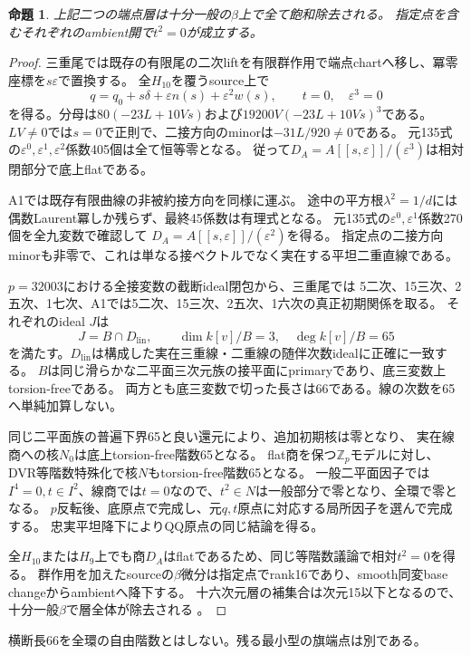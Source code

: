 \documentclass[11pt,a4paper]{ltjsarticle}
\newtheorem{proposition}[theorem]{命題}
\theoremstyle{remark}
\begin{document}
\begin{proposition}
上記二つの端点層は十分一般の$\beta$上で全て飽和除去される。
指定点を含むそれぞれのambient開で$t^2=0$が成立する。
\end{proposition}
\begin{proof}
三重尾では既存の有限尾の二次liftを有限群作用で端点chartへ移し、冪零座標を$s\varepsilon$で置換する。
全$H_{10}$を覆うsource上で
\[
 q=q_0+s\delta+\varepsilon n(s)+\varepsilon^2w(s),\qquad
 t=0,\quad\varepsilon^3=0
\]
を得る。分母は$80(-23L+10Vs)$および$19200V(-23L+10Vs)^3$である。
$LV\ne0$では$s=0$で正則で、二接方向のminorは$-31L/920\ne0$である。
元135式の$\varepsilon^0,\varepsilon^1,\varepsilon^2$係数405個は全て恒等零となる。
従って$D_A=A[[s,\varepsilon]]/(\varepsilon^3)$は相対閉部分で底上flatである。

A1では既存有限曲線の非被約接方向を同様に運ぶ。
途中の平方根$\lambda^2=1/d$には偶数Laurent冪しか残らず、最終45係数は有理式となる。
元135式の$\varepsilon^0,\varepsilon^1$係数270個を全九変数で確認して
$D_A=A[[s,\varepsilon]]/(\varepsilon^2)$を得る。
指定点の二接方向minorも非零で、これは単なる接ベクトルでなく実在する平坦二重直線である。

$p=32003$における全接変数の截断ideal閉包から、三重尾では
5二次、15三次、2五次、1七次、A1では5二次、15三次、2五次、1六次の真正初期関係を取る。
それぞれのideal $J$は
\[
 J=B\cap D_{\mathrm{lin}},\qquad
 \dim k[v]/B=3,\quad\deg k[v]/B=65
\]
を満たす。$D_{\mathrm{lin}}$は構成した実在三重線・二重線の随伴次数idealに正確に一致する。
$B$は同じ滑らかな二平面三次元族の接平面にprimaryであり、底三変数上torsion-freeである。
両方とも底三変数で切った長さは66である。線の次数を65へ単純加算しない。

同じ二平面族の普遍下界65と良い還元により、追加初期核は零となり、
実在線商への核$N_0$は底上torsion-free階数65となる。
flat商を保つ$\mathbb Z_p$モデルに対し、DVR等階数特殊化で核$N$もtorsion-free階数65となる。
一般二平面因子では$ I^4=0,t\in I^2$、線商では$t=0$なので、$t^2\in N$は一般部分で零となり、全環で零となる。
$p$反転後、底原点で完成し、元$q,t$原点に対応する局所因子を選んで完成する。
忠実平坦降下によりQQ原点の同じ結論を得る。

全$H_{10}$または$H_9$上でも商$D_A$はflatであるため、同じ等階数議論で相対$t^2=0$を得る。
群作用を加えたsourceの$\beta$微分は指定点でrank16であり、smooth同変base changeからambientへ降下する。
十六次元層の補集合は次元15以下となるので、十分一般$\beta$で層全体が除去される
\cite{triple-end-v45,rankone-end-v45}。
\end{proof}
横断長66を全環の自由階数とはしない。残る最小型の旗端点は別である。
\end{document}
